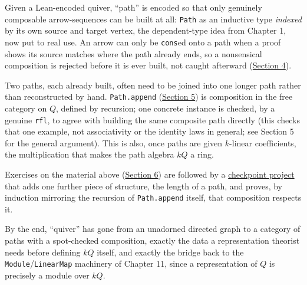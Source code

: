 Given a Lean-encoded quiver, ``path'' is encoded so that only genuinely composable arrow-sequences can be built at all: \texttt{Path} as an inductive type \emph{indexed} by its own source and target vertex, the dependent-type idea from Chapter 1, now put to real use. An arrow can only be \texttt{cons}ed onto a path when a proof shows its source matches where the path already ends, so a nonsensical composition is rejected before it is ever built, not caught afterward (\hyperref[sec:12-path-algebras:04-paths-as-inductive-type:1]{Section 4}).

Two paths, each already built, often need to be joined into one longer path rather than reconstructed by hand. \texttt{Path.append} (\hyperref[sec:12-path-algebras:05-path-composition:1]{Section 5}) is composition in the free category on \(Q\), defined by recursion; one concrete instance is checked, by a genuine \texttt{rfl}, to agree with building the same composite path directly (this checks that one example, not associativity or the identity laws in general; see Section 5 for the general argument). This is also, once paths are given \(k\)-linear coefficients, the multiplication that makes the path algebra \(kQ\) a ring.

Exercises on the material above (\hyperref[sec:12-path-algebras:06-exercises:1]{Section 6}) are followed by a \hyperref[sec:12-path-algebras:07-checkpoint-project:1]{checkpoint project} that adds one further piece of structure, the length of a path, and proves, by induction mirroring the recursion of \texttt{Path.append} itself, that composition respects it.

By the end, ``quiver'' has gone from an unadorned directed graph to a category of paths with a spot-checked composition, exactly the data a representation theorist needs before defining \(kQ\) itself, and exactly the bridge back to the \texttt{Module}/\texttt{LinearMap} machinery of Chapter 11, since a representation of \(Q\) is precisely a module over \(kQ\).









